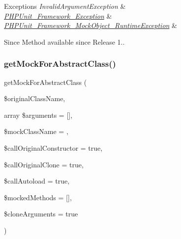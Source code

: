 \begin{DoxyExceptions}{Exceptions}
{\em Invalid\+Argument\+Exception} & \\
\hline
{\em \mbox{\hyperlink{class_p_h_p_unit___framework___exception}{P\+H\+P\+Unit\+\_\+\+Framework\+\_\+\+Exception}}} & \\
\hline
{\em \mbox{\hyperlink{class_p_h_p_unit___framework___mock_object___runtime_exception}{P\+H\+P\+Unit\+\_\+\+Framework\+\_\+\+Mock\+Object\+\_\+\+Runtime\+Exception}}} & \\
\hline
\end{DoxyExceptions}
\begin{DoxySince}{Since}
Method available since Release 1.. 
\end{DoxySince}
\mbox{\label{class_p_h_p_unit___framework___mock_object___generator_a48f47851bf11e93ca38eae5fef655e6c}} 
\subsubsection{\texorpdfstring{get\+Mock\+For\+Abstract\+Class()}{getMockForAbstractClass()}}
{\footnotesize\ttfamily get\+Mock\+For\+Abstract\+Class (\begin{DoxyParamCaption}\item[{}]{\$original\+Class\+Name,  }\item[{array}]{\$arguments = {\ttfamily \mbox{[}\mbox{]}},  }\item[{}]{\$mock\+Class\+Name = {\ttfamily \textquotesingle{}\textquotesingle{}},  }\item[{}]{\$call\+Original\+Constructor = {\ttfamily true},  }\item[{}]{\$call\+Original\+Clone = {\ttfamily true},  }\item[{}]{\$call\+Autoload = {\ttfamily true},  }\item[{}]{\$mocked\+Methods = {\ttfamily \mbox{[}\mbox{]}},  }\item[{}]{\$clone\+Arguments = {\ttfamily true} }\end{DoxyParamCaption})}

